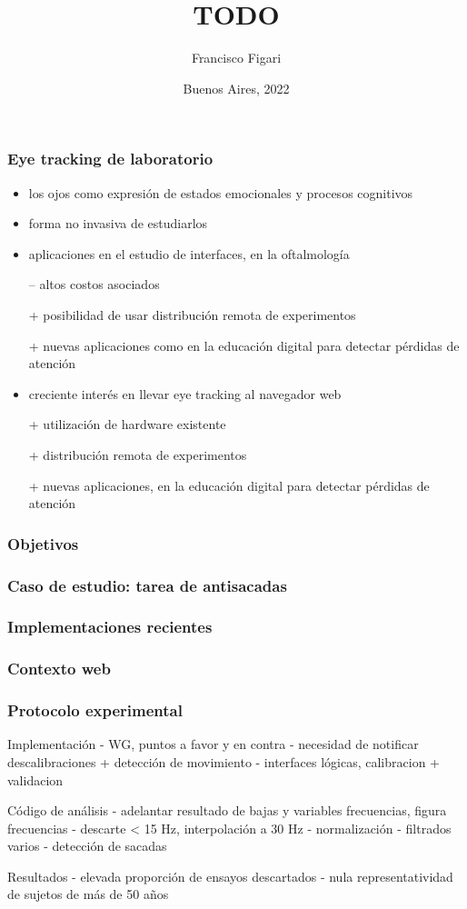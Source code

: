 \documentclass{beamer}
\title{TODO}
\author{Francisco Figari}
\date{Buenos Aires, 2022}
\begin{document}
\frame{\titlepage}

\begin{frame}
\frametitle{Eye tracking de laboratorio} %

  \begin{itemize}
    \item los ojos como expresión de estados emocionales y procesos cognitivos
    \item forma no invasiva de estudiarlos
    \item aplicaciones en el estudio de interfaces, en la oftalmología
    \item[--] altos costos asociados
    \item[+] posibilidad de usar distribución remota de experimentos
    \item[+] nuevas aplicaciones como en la educación digital para detectar
      pérdidas de atención
  \end{itemize}

  \begin{itemize}
    \item creciente interés en llevar eye tracking al navegador web
    \item[+] utilización de hardware existente
    \item[+] distribución remota de experimentos
    \item[+] nuevas aplicaciones, \eg en la educación digital para detectar
      pérdidas de atención
  \end{itemize}
  
\end{frame}

\begin{frame}
\frametitle{Objetivos}
\end{frame}

\begin{frame}
\frametitle{Caso de estudio: tarea de antisacadas}
\end{frame}

\begin{frame}
\frametitle{Implementaciones recientes}
\end{frame}

\begin{frame}
\frametitle{Contexto web}
\end{frame}

\begin{frame}
\frametitle{Protocolo experimental}
\end{frame}

Implementación
  - WG, puntos a favor y en contra
  - necesidad de notificar descalibraciones + detección de movimiento
  - interfaces lógicas, calibracion + validacion

Código de análisis
  - adelantar resultado de bajas y variables frecuencias, figura frecuencias
  - descarte < 15 Hz, interpolación a 30 Hz
  - normalización
  - filtrados varios
  - detección de sacadas

Resultados
  - elevada proporción de ensayos descartados
  - nula representatividad de sujetos de más de 50 años
  
\end{document}
